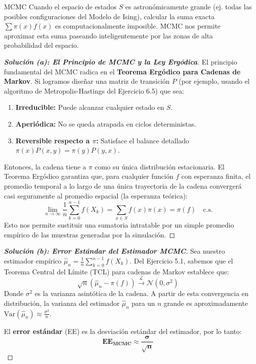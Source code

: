 \documentclass[10pt,a4paper]{article}
\begin{document}
\vspace{2mm}

\begin{nota}{MCMC}
    Cuando el espacio de estados $S$ es astronómicamente grande (ej. todas las posibles configuraciones del Modelo de Ising), calcular la suma exacta $\sum \pi(x)f(x)$ es computacionalmente imposible. MCMC nos permite aproximar esta suma paseando inteligentemente por las zonas de alta probabilidad del espacio.
\end{nota}

\begin{proof}[\textbf{Solución (a): El Principio de MCMC y la Ley Ergódica}]
    El principio fundamental del MCMC radica en el \textbf{Teorema Ergódico para Cadenas de Markov}. Si logramos diseñar una matriz de transición $P$ (por ejemplo, usando el algoritmo de Metropolis-Hastings del Ejercicio 6.5) que sea:
    \begin{enumerate}
        \item \textbf{Irreducible:} Puede alcanzar cualquier estado en $S$.
        \item \textbf{Aperiódica:} No se queda atrapada en ciclos deterministas.
        \item \textbf{Reversible respecto a $\pi$:} Satisface el balance detallado $\pi(x)P(x,y) = \pi(y)P(y,x)$.
    \end{enumerate}
    Entonces, la cadena tiene a $\pi$ como su única distribución estacionaria. El Teorema Ergódico garantiza que, para cualquier función $f$ con esperanza finita, el promedio temporal a lo largo de una única trayectoria de la cadena convergerá casi seguramente al promedio espacial (la esperanza teórica):
    \[ \lim_{n \to \infty} \frac{1}{n} \sum_{k=0}^{n-1} f(X_k) = \sum_{x \in S} f(x)\pi(x) = \pi(f) \quad \text{c.s.} \]
    Esto nos permite sustituir una sumatoria intratable por un simple promedio empírico de las muestras generadas por la simulación.
\end{proof}

\vspace{5mm}

\begin{proof}[\textbf{Solución (b): Error Estándar del Estimador MCMC}]
    Sea nuestro estimador empírico $\hat{\mu}_n = \frac{1}{n} \sum_{k=0}^{n-1} f(X_k)$.
    Del Ejercicio 5.1, sabemos que el Teorema Central del Límite (TCL) para cadenas de Markov establece que:
    \[ \sqrt{n} (\hat{\mu}_n - \pi(f)) \xrightarrow{\mathcal{L}} \mathcal{N}(0, \sigma^2) \]
    Donde $\sigma^2$ es la varianza asintótica de la cadena. 
    A partir de esta convergencia en distribución, la varianza del estimador $\hat{\mu}_n$ para un $n$ grande es aproximadamente $\text{Var}(\hat{\mu}_n) \approx \frac{\sigma^2}{n}$.
    
    El \textbf{error estándar} (EE) es la desviación estándar del estimador, por lo tanto:
    \[ \mathbf{EE_{MCMC} \approx \frac{\sigma}{\sqrt{n}}} \]
\end{proof}
\end{document}
